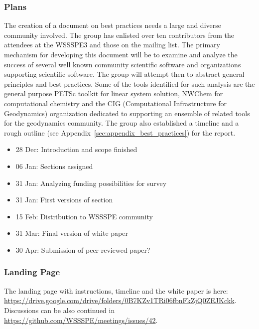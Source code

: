 \subsubsection{Plans}
The creation of a document on best practices needs a large and diverse community
involved. The group has enlisted over ten contributors from the attendees at the
WSSSPE3 and those on the mailing list. The primary mechanism for developing this
document will be to examine and analyze the success of several well known
community scientific software and organizations supporting scientific software.
The group will attempt then to abstract general principles and best practices. Some of
the tools identified for such analysis are the general purpose PETSc toolkit for
linear system solution, NWChem for computational chemistry and the CIG
(Computational Infrastructure for Geodynamics) organization dedicated to
supporting an ensemble of related tools for the geodynamics community. The group also
established a timeline and a rough outline (see
Appendix~\ref{sec:appendix_best_practices}) for the report.

\medskip
{}
\begin{itemize}
%
\item 28 Dec: Introduction and scope finished
\item 06 Jan: Sections assigned
\item 31 Jan: Analyzing funding possibilities for survey
\item 31 Jan: First versions of section
\item 15 Feb: Distribution to WSSSPE community
\item 31 Mar: Final version of white paper
\item 30 Apr: Submission of peer-reviewed paper?
\end{itemize}


\subsubsection{Landing Page}
The landing page with instructions, timeline and the white paper is here: \url{https://drive.google.com/drive/folders/0B7KZv1TRi06fbnFkZjQ0ZEJKckk}.
Discussions can be also continued in \url{https://github.com/WSSSPE/meetings/issues/42}.
